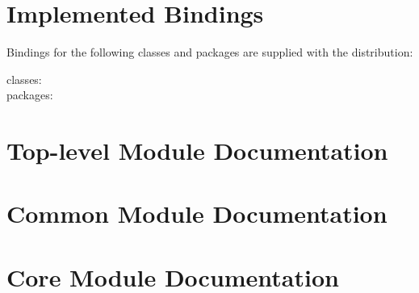 \documentclass{book}
\begin{document}
\chapter[Bindings]{Implemented Bindings}\label{included.bindings}
Bindings for the following classes and packages are supplied with the distribution:
\begin{description}
\item[classes:] \CurrentClasses
\item[packages:] \CurrentPackages
\end{description}

\chapter[Modules]{Top-level Module Documentation}\label{modules}





\chapter[Common Modules]{Common Module Documentation}\label{commonmodules}





















\chapter[Core Modules]{Core Module Documentation}\label{coremodules}
\end{document}
